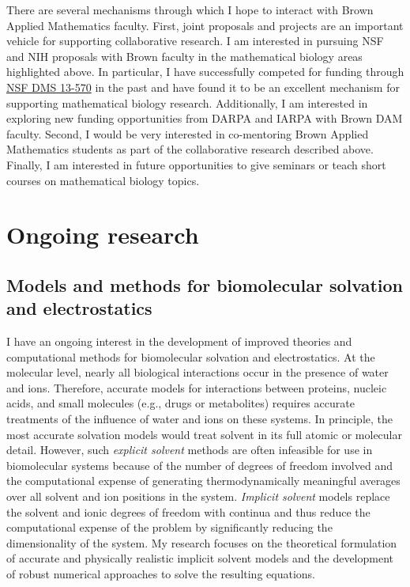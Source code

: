 \documentclass[11pt]{amsart}
\begin{document}
There are several mechanisms through which I hope to interact with Brown Applied Mathematics faculty.
First, joint proposals and projects are an important vehicle for supporting collaborative research.
I am interested in pursuing NSF and NIH proposals with Brown faculty in the mathematical biology areas highlighted above. 
In particular, I have successfully competed for funding through \href{http://www.nsf.gov/pubs/2013/nsf13570/nsf13570.htm}{NSF DMS 13-570} in the past and have found it to be an excellent mechanism for supporting mathematical biology research.
Additionally, I am interested in exploring new funding opportunities from DARPA and IARPA with Brown DAM faculty.
Second, I would be very interested in co-mentoring Brown Applied Mathematics students as part of the collaborative research described above.
Finally, I am interested in future opportunities to give seminars or teach short courses on mathematical biology topics.

\section{Ongoing research}

\subsection{Models and methods for biomolecular solvation and electrostatics}
I have an ongoing interest in the development of improved theories and computational methods for biomolecular solvation and electrostatics.
At the molecular level, nearly all biological interactions occur in the presence of water and ions.
Therefore, accurate models for interactions between proteins, nucleic acids, and small molecules (e.g., drugs or metabolites) requires accurate treatments of the influence of water and ions on these systems.
In principle, the most accurate solvation models would treat solvent in its full atomic or molecular detail.
However, such \emph{explicit solvent} methods are often infeasible for use in biomolecular systems because of the number of degrees of freedom involved and the computational expense of generating thermodynamically meaningful averages over all solvent and ion positions in the system.
\emph{Implicit solvent} models replace the solvent and ionic degrees of freedom with continua and thus reduce the computational expense of the problem by significantly reducing the dimensionality of the system.
My research focuses on the theoretical formulation of accurate and physically realistic implicit solvent models and the development of robust numerical approaches to solve the resulting equations.
\end{document}
